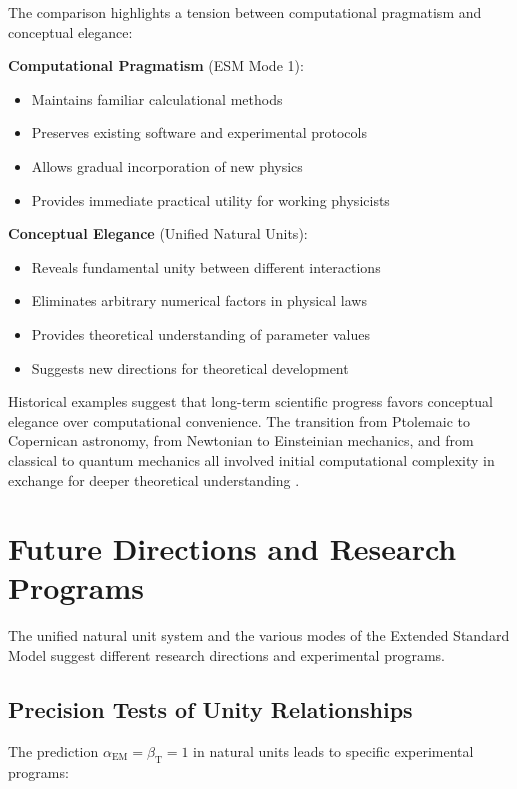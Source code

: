 \documentclass[12pt,a4paper]{article}
\newcommand{\alphaEM}{\alpha_{\text{EM}}}
\newcommand{\betaT}{\beta_{\text{T}}}
\begin{document}
	The comparison highlights a tension between computational pragmatism and conceptual elegance:
	
	\textbf{Computational Pragmatism} (ESM Mode 1):
	\begin{itemize}
		\item Maintains familiar calculational methods
		\item Preserves existing software and experimental protocols
		\item Allows gradual incorporation of new physics
		\item Provides immediate practical utility for working physicists
	\end{itemize}
	
	\textbf{Conceptual Elegance} (Unified Natural Units):
	\begin{itemize}
		\item Reveals fundamental unity between different interactions
		\item Eliminates arbitrary numerical factors in physical laws
		\item Provides theoretical understanding of parameter values
		\item Suggests new directions for theoretical development
	\end{itemize}
	
	Historical examples suggest that long-term scientific progress favors conceptual elegance over computational convenience. The transition from Ptolemaic to Copernican astronomy, from Newtonian to Einsteinian mechanics, and from classical to quantum mechanics all involved initial computational complexity in exchange for deeper theoretical understanding \cite{Kuhn1962}.
	
	\section{Future Directions and Research Programs}
	\label{sec:future_directions}
	
	The unified natural unit system and the various modes of the Extended Standard Model suggest different research directions and experimental programs.
	
	\subsection{Precision Tests of Unity Relationships}
	\label{subsec:precision_tests}
	
	The prediction $\alphaEM = \betaT = 1$ in natural units leads to specific experimental programs:
	
\end{document}
